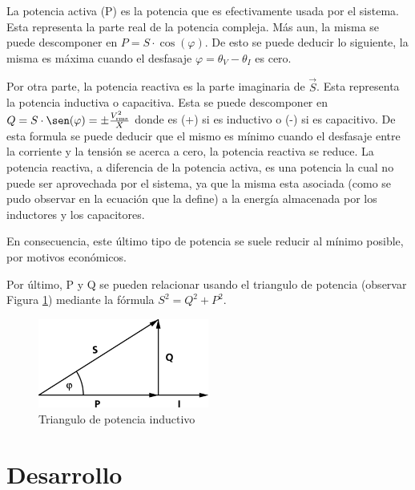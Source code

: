 \documentclass{article}
\begin{document}
        La potencia activa (P) es la potencia que es efectivamente usada por el sistema. Esta representa la parte real de la potencia compleja.
        Más aun, la misma se puede descomponer en $P= S \cdot \cos (\varphi)$. De esto se puede deducir lo siguiente, la misma es máxima cuando el desfasaje $\varphi = \theta_{V} - \theta_I $ es cero. \par

        Por otra parte, la potencia reactiva es la parte imaginaria de $\vec{S}$. Esta representa la potencia inductiva o capacitiva. Esta se puede descomponer en $ Q = S \cdot \sen (\varphi)= \pm \frac{V_\text{rms}^2}{X}$ donde es (+) si es inductivo o (-) si es capacitivo.
        De esta formula se puede deducir que el mismo es mínimo cuando el desfasaje entre la corriente y la tensión se acerca a cero, 
        la potencia reactiva se reduce. La potencia reactiva, a diferencia de la potencia activa, es una potencia la cual no puede ser aprovechada por el sistema, 
        ya que la misma esta asociada (como se pudo observar en la ecuación que la define) a la energía almacenada por los inductores y los capacitores.\par

        En consecuencia, este último tipo de potencia se suele reducir al mínimo posible, por motivos económicos.

        Por último, P y Q se pueden relacionar usando el triangulo de potencia (observar Figura \ref{fig:triangulo_de_potencia}) mediante la fórmula $S^2=Q^2+P^2$. 
        \begin{figure}[h!] %
            \centering
            \includegraphics[width=0.5\textwidth]{Trojkat-mocy.png} %
            \caption{Triangulo de potencia inductivo}
            \label{fig:triangulo_de_potencia} %
        \end{figure}

    \indent
    \section{Desarrollo}
\end{document}

